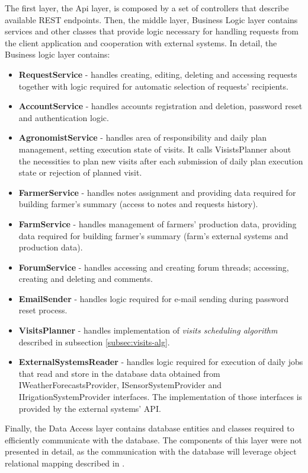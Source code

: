 The first layer, the Api layer, is composed by a set of controllers that describe available REST endpoints. Then, the middle layer, Business Logic layer contains services and other classes that provide logic necessary for handling requests from the client application and cooperation with external systems. In detail, the Business logic layer contains:
\begin{itemize}
    \item \textbf{RequestService} - handles creating, editing, deleting and accessing requests together with logic required for automatic selection of requests' recipients.
    \item \textbf{AccountService} - handles accounts registration and deletion, password reset and authentication logic.
    \item \textbf{AgronomistService} - handles area of responsibility and daily plan management, setting execution state of visits. It calls VisistsPlanner about the necessities to plan new visits after each submission of daily plan execution state or rejection of planned visit.
    \item \textbf{FarmerService} - handles notes assignment and providing data required for building farmer's summary (access to notes and requests history).
    \item \textbf{FarmService} - handles management of farmers' production data, providing data required for building farmer's summary (farm's external systems and  production data).  
    \item \textbf{ForumService} - handles accessing and creating forum threads; accessing, creating and deleting and comments.
    \item \textbf{EmailSender} - handles logic required for e-mail sending during password reset process.
    \item \textbf{VisitsPlanner} - handles implementation of \textit{visits scheduling algorithm} described in subsection \ref{subsec:visits-alg}.
    \item \textbf{ExternalSystemsReader} - handles logic required for execution of daily jobs that read and store in the database data obtained from IWeatherForecastsProvider, ISensorSystemProvider and IIrigationSystemProvider interfaces. The implementation of those interfaces is provided by the external systems' API. 
\end{itemize}

Finally, the Data Access layer contains database entities and classes required to efficiently communicate with the database. The components of this layer were not presented in detail, as the communication with the database will leverage object relational mapping described in .

